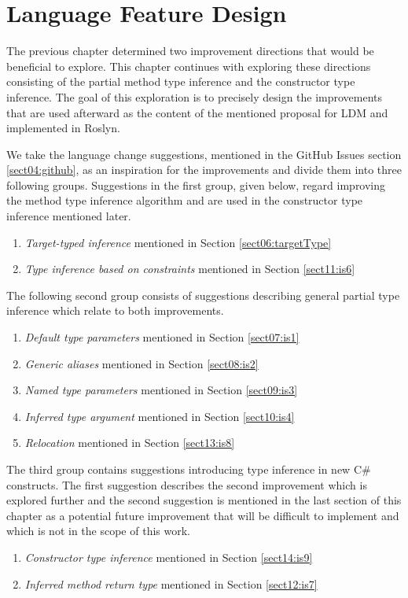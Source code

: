 \chapter{Language Feature Design} \label{sect09:lang}

The previous chapter determined two improvement directions that would be beneficial to explore. 
This chapter continues with exploring these directions consisting of the partial method type inference and the constructor type inference. 
The goal of this exploration is to precisely design the improvements that are used afterward as the content of the mentioned proposal for LDM and implemented in Roslyn.
\par
We take the language change suggestions, mentioned in the GitHub Issues section \ref{sect04:github}, as an inspiration for the improvements and divide them into three following groups.
Suggestions in the first group, given below, regard improving the method type inference algorithm and are used in the constructor type inference mentioned later.
\begin{enumerate}
  \item \textit{Target-typed inference} mentioned in Section \ref{sect06:targetType}
  \item \textit{Type inference based on constraints} mentioned in Section \ref{sect11:is6}
\end{enumerate}
The following second group consists of suggestions describing general partial type inference which relate to both improvements.
\begin{enumerate}
  \item \textit{Default type parameters} mentioned in Section \ref{sect07:is1}
  \item \textit{Generic aliases} mentioned in Section \ref{sect08:is2}
  \item \textit{Named type parameters} mentioned in Section \ref{sect09:is3}
  \item \textit{Inferred type argument} mentioned in Section \ref{sect10:is4}
  \item \textit{Relocation} mentioned in Section \ref{sect13:is8}
\end{enumerate}
The third group contains suggestions introducing type inference in new C\# constructs. 
The first suggestion describes the second improvement which is explored further and the second suggestion is mentioned in the last section of this chapter as a potential future improvement that will be difficult to implement and which is not in the scope of this work.
\begin{enumerate}
  \item \textit{Constructor type inference} mentioned in Section \ref{sect14:is9}
  \item \textit{Inferred method return type} mentioned in Section \ref{sect12:is7}
\end{enumerate}

